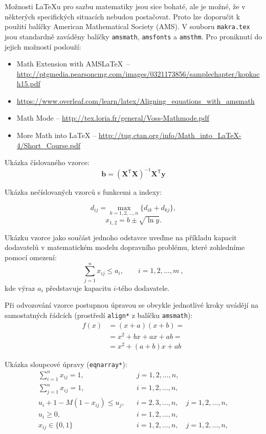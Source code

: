 Možnosti \LaTeX u pro sazbu matematiky jsou sice bohaté, ale je možné, že v některých specifických situacích nebudou postačovat. Proto lze doporučit k použití balíčky American Mathematical Society (AMS). V souboru \texttt{makra.tex} jsou standardně zaváděny balíčky \texttt{amsmath}, \texttt{amsfonts} a \texttt{amsthm}. Pro proniknutí do jejich možností poslouží:
\begin{itemize}
\item Math Extension with AMS\LaTeX\ -- \url{http://ptgmedia.pearsoncmg.com/images/0321173856/samplechapter/kopkach15.pdf}
\item \url{https://www.overleaf.com/learn/latex/Aligning_equations_with_amsmath}
\item Math Mode -- \url{http://tex.loria.fr/general/Voss-Mathmode.pdf}
\item More Math into LaTeX -- \url{http://tug.ctan.org/info/Math_into_LaTeX-4/Short_Course.pdf}
\end{itemize}

Ukázka číslovaného vzorce:
\begin{equation}
\mathbf{b}=(\mathbf{X}^\mathsf{T}\mathbf{X})^{-1}\mathbf{X}^\mathsf{T}\mathbf{y}
\end{equation}

Ukázka nečíslovaných vzorců s funkcemi a indexy:

$$
d_{ij}=\max_{k=1,2,\dots,n} \{d_{ik}+d_{kj}\},
$$
$$
x_{1,2}=b \pm \sqrt{\ln y}.
$$

Ukázku vzorce jako součást jednoho odstavce uveďme na příkladu kapacit dodavatelů v matematickém modelu dopravního problému, které zohledníme pomocí omezení:
\begin{equation}
\sum_{j=1}^n x_{ij} \le a_i, \qquad i=1,2,\dots,m\ ,
\end{equation}
\noindent
kde výraz $a_i$ představuje kapacitu $i$-tého dodavatele.

Při odvozování vzorce postupnou úpravou se obvykle jednotlivé kroky uvádějí na samostatných řádcích (prostředí \verb'align*' z balíčku \verb|amsmath|):
\begin{align*}
 f(x) &= (x+a)(x+b) =\\
      &= x^2 + bx + ax + ab =\\
      &= x^2 + (a+b)x + ab
\end{align*}

Ukázka sloupcové úpravy (\verb|eqnarray*|):
\begin{eqnarray*}
\sum_{i=1}^n x_{ij} =1, && j=1,2,\dots,n,\\
\sum_{j=1}^n x_{ij} =1, && i=1,2,\dots,n,\\
u_i + 1 - M(1 - x_{ij}) \le u_j, && i=2,3,\dots,n,\quad j=1,2,\dots,n,\\
u_i \ge 0,              && i=1,2,\dots,n,\\
x_{ij} \in \{0,1\} && i=1,2,\dots,n,\quad j=1,2,\dots,n,\\
\end{eqnarray*}